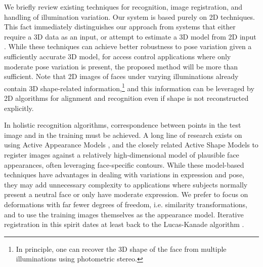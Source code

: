 \documentclass[12pt,journal,draftcls,letterpaper,onecolumn]{IEEEtran}
\begin{document}
We briefly review existing techniques for recognition, image registration, and
handling of illumination variation.  Our system is based purely on 2D
techniques.  This fact immediately distinguishes our approach from systems
that either require a 3D data as an input, or attempt to estimate a 3D model
from 2D input \cite{amberg2007reconstructing,Blanz2003-PAMI}.  While these
techniques can achieve better robustness to pose variation given
a sufficiently accurate 3D model, for access control applications where only 
moderate pose variation is present, the proposed method will be more
than sufficient.   Note that 2D images of faces
under varying illuminations already contain 3D shape-related information,\footnote{In principle,
one can recover the 3D shape of the face from multiple illuminations using photometric stereo.} 
and this information can be leveraged by 2D algorithms for alignment and recognition 
even if shape is not reconstructed explicitly. 

In holistic recognition algorithms, correspondence between points in the test
image and in the training must be achieved.  A long line of research exists on
using Active Appearance Models \cite{Cootes2001-PAMI}, and the closely related
Active Shape Models \cite{cootes1992active} to register images against a
relatively high-dimensional model of plausible face appearances, often
leveraging face-specific contours.  While these model-based techniques have
advantages in dealing with variations in expression and pose, they may add
unnecessary complexity to applications where subjects normally present a neutral face
or only have moderate expression. We prefer to focus on deformations with far fewer 
degrees of freedom, i.e. similarity transformations, and to use the training images themselves 
as the appearance model. Iterative registration in this spirit dates at least back to the 
Lucas-Kanade algorithm \cite{lucas1981iterative}.
\end{document}
